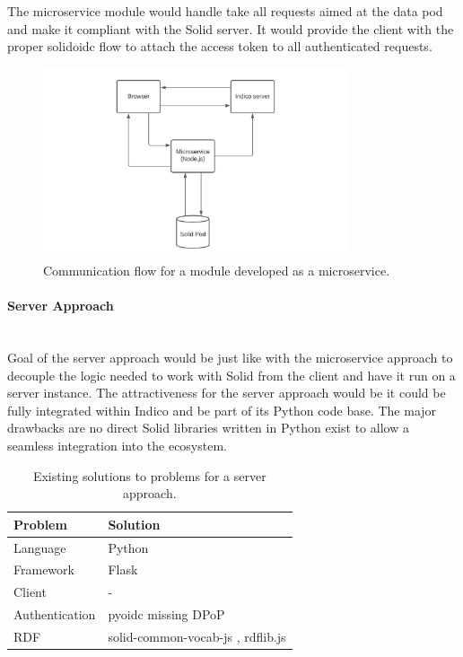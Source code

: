 The microservice module would handle take all requests aimed at the data pod and make it compliant with the Solid server. It would provide the client with the proper \gls{solidoidc} flow to attach the access token to all authenticated requests.

\begin{figure}[H]
    \centering
    \includegraphics[width=0.8\textwidth]{prototype/graphs/poc-infrastructure-microservice.jpeg}
    \caption{Communication flow for a module developed as a microservice.}
    \label{fig:poc-infrastructure-microservice}
\end{figure}

\paragraph{Server Approach}\mbox{}\\

Goal of the server approach would be just like with the microservice approach to decouple the logic needed to work with Solid from the client and have it run on a server instance. The attractiveness for the server approach would be it could be fully integrated within Indico and be part of its Python code base. The major drawbacks are no direct Solid libraries written in Python exist to allow a seamless integration into the ecosystem.

\begin{table}[!ht]
    \centering
    \begin{tabular}{| l | l |} 
    \hline
     Problem & Solution \\
     \hline
      Language & Python  \\
      Framework & Flask  \\
      Client & -  \\
      Authentication & pyoidc \cite{pyoidc} missing DPoP\\
      RDF & solid-common-vocab-js \cite{solid-common-vocab-js}, rdflib.js \cite{rdflib.js}  \\
    \hline
    \end{tabular}
    \vspace{0.75cm}
    \caption{Existing solutions to problems for a server approach.}
    \label{table:3}
\end{table}

